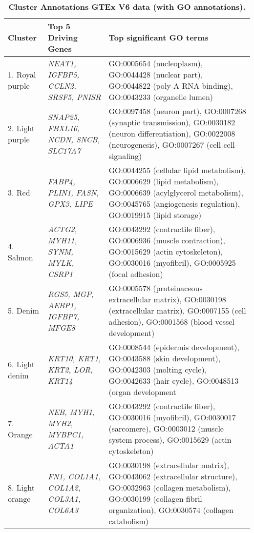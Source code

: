 \clearpage
\begin{table}[!hp]
\begin{adjustwidth}{-.5in}{0in} %
\footnotesize
\centering
\caption{\bf Cluster Annotations GTEx V6 data (with GO annotations).}
\renewcommand{\arraystretch}{1.7}
\begin{tabular}{|p{1.0in}|p{1.5in}|p{4.3in}|} 
\hline
Cluster & Top 5 Driving \qquad Genes  &  Top significant GO terms \\
\hline
1. Royal purple & \textit{NEAT1, IGFBP5, CCLN2, SRSF5, PNISR} & GO:0005654 (nucleoplasm), GO:0044428 (nuclear part), GO:0044822 (poly-A RNA binding), GO:0043233 (organelle lumen)  \\ \hline
2. Light purple & \textit{SNAP25, FBXL16, NCDN, SNCB, SLC17A7} & GO:0097458 (neuron part), GO:0007268 (synaptic transmission), GO:0030182 (neuron differentiation), GO:0022008 (neurogenesis), GO:0007267 (cell-cell signaling) \\ \hline
3. Red & \textit{FABP4, PLIN1, FASN, GPX3, LIPE} & GO:0044255 (cellular lipid metabolism), GO:0006629 (lipid metabolism), GO:0006639 (acylglycerol metabolism), GO:0045765 (angiogenesis regulation), GO:0019915 (lipid storage) \\ \hline
4. Salmon & \textit{ACTG2, MYH11, SYNM, MYLK, CSRP1} & GO:0043292 (contractile fiber), GO:0006936 (muscle contraction), GO:0015629 (actin cytoskeleton), GO:0030016 (myofibril), GO:0005925 (focal adhesion) \\ \hline
5. Denim & \textit{RGS5, MGP,  AEBP1, IGFBP7, MFGE8} & GO:0005578 (proteinaceous extracellular matrix), GO:0030198 (extracellular matrix), GO:0007155 (cell adhesion), GO:0001568 (blood vessel development) \\ \hline
6. Light denim & \textit{KRT10, KRT1, KRT2, LOR, KRT14} & GO:0008544 (epidermis development), GO:0043588 (skin development), GO:0042303 (molting cycle), GO:0042633 (hair cycle), GO:0048513 (organ development \\ \hline
7. Orange & \textit{NEB, MYH1, MYH2, MYBPC1, ACTA1} & GO:0043292 (contractile fiber), GO:0030016 (myofibril), GO:0030017 (sarcomere), GO:0003012 (muscle system process), GO:0015629 (actin cytoskeleton) \\ \hline
8. Light orange & \textit{FN1, COL1A1, COL1A2, COL3A1, COL6A3} & GO:0030198 (extracellular matrix), GO:0043062 (extracellular structure), GO:0032963 (collagen metabolism), GO:0030199 (collagen fibril organization), GO:0030574 (collagen catabolism) \\ \hline

\end{tabular}
\end{adjustwidth}
\end{table}

